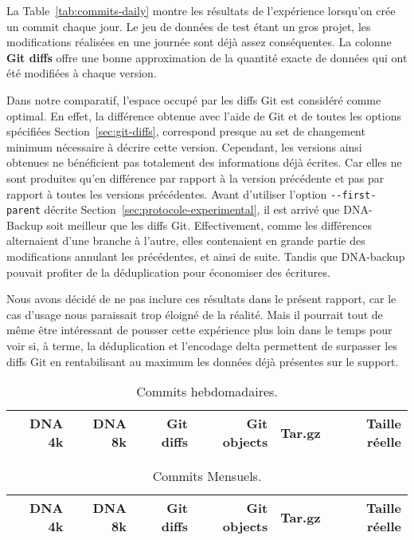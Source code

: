 \documentclass[a4paper]{report}
\newcommand{\fonts}[2][m]{{\fontseries{#1}\selectfont #2}} %
\newcommand{\textb}{\fonts[b]}
\begin{document}
La Table~\ref{tab:commits-daily} montre les résultats de l'expérience
lorsqu'on crée un commit chaque jour.
Le jeu de données de test étant un gros projet,
les modifications réalisées en une journée sont déjà assez conséquentes.
La colonne \textbf{Git diffs} offre une bonne approximation
de la quantité exacte de données qui ont été modifiées à chaque version.

Dans notre comparatif, l'espace occupé par les diffs Git est considéré comme optimal.
En effet, la différence obtenue avec l'aide de Git
et de toutes les options spécifiées Section~\ref{sec:git-diffs},
correspond presque au set de changement minimum nécessaire à décrire cette version.
Cependant, les versions ainsi obtenues ne bénéficient pas totalement des informations déjà écrites.
Car elles ne sont produites qu'en différence par rapport à la version précédente
et pas par rapport à toutes les versions précédentes.
Avant d'utiliser l'option \verb|--first-parent| décrite Section~\ref{sec:protocole-experimental},
il est arrivé que DNA-Backup soit meilleur que les diffs Git.
Effectivement, comme les différences alternaient d'une branche à l'autre,
elles contenaient en grande partie des modifications annulant les précédentes, et ainsi de suite.
Tandis que DNA-backup pouvait profiter de la déduplication pour économiser des écritures.

Nous avons décidé de ne pas inclure ces résultats dans le présent rapport,
car le cas d'usage nous paraissait trop éloigné de la réalité.
Mais il pourrait tout de même être intéressant de pousser cette expérience plus loin dans le temps
pour voir si, à terme, la déduplication et l'encodage delta permettent de surpasser les diffs Git
en rentabilisant au maximum les données déjà présentes sur le support.


\begin{table*}[ht]
\small
\centering
\begin{tabularx}{\textwidth}{@{}RRRRRR}
\textb{DNA 4k} &
\textb{DNA 8k} &
\textb{Git diffs} &
\textb{Git objects} &
\textb{Tar.gz} &
\textb{Taille réelle} \\
\hline

\end{tabularx}
\caption{Commits hebdomadaires.}
\label{tab:commits-weekly}
\end{table*}

\begin{table*}[ht]
\small
\centering
\begin{tabularx}{\textwidth}{@{}RRRRRR}
\textb{DNA 4k} &
\textb{DNA 8k} &
\textb{Git diffs} &
\textb{Git objects} &
\textb{Tar.gz} &
\textb{Taille réelle} \\
\hline

\end{tabularx}
\caption{Commits Mensuels.}
\label{tab:commits-monthly}
\end{table*}
\end{document}
